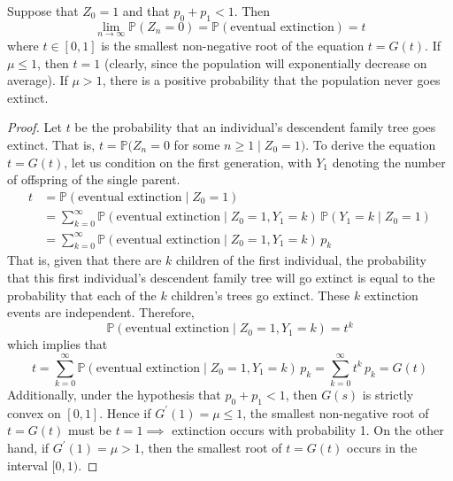 	\begin{theorem}
		\label{thm:extinction-probability-as-a-fixed-point}
		Suppose that $Z_0 = 1$ and that $p_0 + p_1 < 1$. Then
		\begin{equation}
			\lim_{n \rightarrow \infty} \mathbb{P}(Z_n = 0) = \mathbb{P}(\text{eventual extinction}) = t
		\end{equation}
		where $t \in [0, 1]$ is the smallest non-negative root of the equation $t = G(t)$. If $\mu \leq 1$, then $t = 1$ (clearly, since the population will exponentially decrease on average). If $\mu > 1$, there is a positive probability that the population never goes extinct. 
	\end{theorem}
	\begin{proof}
		Let $t$ be the probability that an individual's descendent family tree goes extinct. That is, $t = \mathbb{P}(Z_n = 0$ for some $n \geq 1 \; | \; Z_0 = 1)$. To derive the equation $t = G(t)$, let us condition on the first generation, with $Y_1$ denoting the number of offspring of the single parent. 
		\begin{align*}
			t & = \mathbb{P}(\text{eventual extinction} \; | \; Z_0 = 1) \\
			& = \sum_{k=0}^\infty \mathbb{P}(\text{eventual extinction} \; | \; Z_0 = 1, Y_1 = k) \, \mathbb{P}(Y_1 = k \; | \; Z_0 = 1) \\
			& = \sum_{k=0}^\infty \mathbb{P}(\text{eventual extinction} \; | \;Z_0 =1, Y_1 = k) \, p_k
		\end{align*}
		That is, given that there are $k$ children of the first individual, the probability that this first individual's descendent family tree will go extinct is equal to the probability that each of the $k$ children's trees go extinct. These $k$ extinction events are independent. Therefore, 
		\begin{equation}
			\mathbb{P}(\text{eventual extinction} \; | \;Z_0 = 1, Y_1 = k) = t^k
		\end{equation}
		which implies that 
		\begin{equation}
			t = \sum_{k=0}^\infty \mathbb{P}(\text{eventual extinction} \; | \; Z_0 = 1, Y_1 = k) \, p_k = \sum_{k=0}^\infty t^k \, p_k = G(t)
		\end{equation}
		Additionally, under the hypothesis that $p_0 + p_1 < 1$, then $G(s)$ is strictly convex on $[0,1]$. Hence if $G^\prime (1) = \mu \leq 1$, the smallest non-negative root of $t = G(t)$ must be $t=1 \implies$ extinction occurs with probability 1. On the other hand, if $G^\prime (1) = \mu > 1$, then the smallest root of $t = G(t)$ occurs in the interval $[0,1)$. 
	\end{proof}

